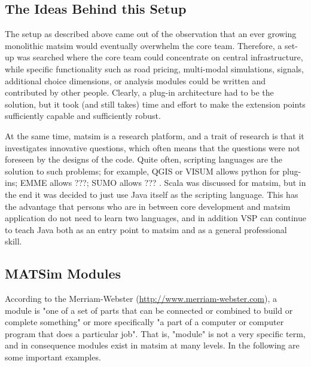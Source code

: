 \subsection{The Ideas Behind this Setup}
The setup as described above came out of the observation that an ever growing monolithic \gls{matsim} would eventually overwhelm the core team. Therefore, a set-up was searched where the core team could concentrate on central infrastructure, while specific functionality such as road pricing, multi-modal simulations, signals, additional choice dimensions, or analysis modules could be written and contributed by other people. Clearly, a plug-in architecture had to be the solution, but it took (and still takes) time and effort to make the extension points sufficiently capable and sufficiently robust.  

At the same time, \gls{matsim} is a research platform, and a trait of research is that it investigates innovative questions, which often means that the questions were not foreseen by the designs of the code.  Quite often, scripting languages are the solution to such problems; for example, QGIS or VISUM allows python \cite{...} for plug-ins; EMME allows ???; SUMO allows ??? .  Scala \cite{...} was discussed for \gls{matsim}, but in the end it was decided to just use Java itself as the scripting language. This has the advantage that persons who are in between core development and \gls{matsim} application do not need to learn two languages, and in addition VSP can continue to teach Java both as an entry point to \gls{matsim} and as a general professional skill.

\subsection{MATSim Modules}
According to the Merriam-Webster (\url{http://www.merriam-webster.com}), a module is
%
"one of a set of parts that can be connected or combined to build or complete something" 
%
or more specifically
%
"a part of a computer or computer program that does a particular job". 
%
That is, "module" is not a very specific term, and in consequence modules exist in \gls{matsim} at many levels.
%
In the following are some important examples.


